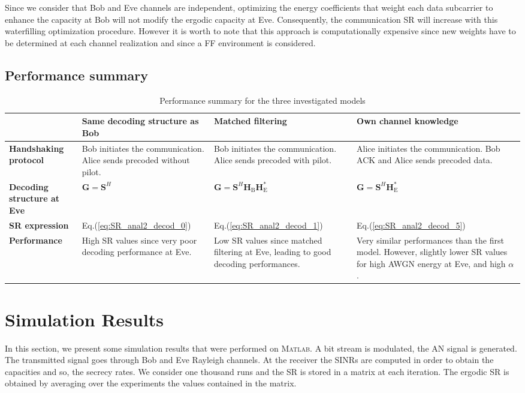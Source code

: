\documentclass[journal,comsoc]{IEEEtran}
\let\MYoriglatexcaption\caption
\renewcommand{\caption}[2][\relax]{\MYoriglatexcaption[#2]{#2}}
\newcommand{\HE}{\textbf{H}_{\text{E}}}
\newcommand{\HB}{\textbf{H}_{\text{B}}}
\newcommand{\spread}{\textbf{S}}
\begin{document}
Since we consider that Bob and Eve channels are independent, optimizing the energy coefficients that weight each data subcarrier to enhance the capacity at Bob will not modify the  ergodic capacity at Eve. Consequently, the communication SR will increase with this waterfilling optimization procedure. However it is worth to note that this approach is computationally expensive since new weights have to be determined at each channel realization and since a FF environment is considered. 

\subsection{Performance summary}
\begin{table}[!thb]
	\centering
	\begin{tabular}{|p{1.8cm}|p{1.8cm}|p{1.8cm}|p{1.8cm}|}
		\hline
		& \textbf{Same decoding structure as Bob} & \textbf{Matched filtering}  & \textbf{Own channel knowledge}  \\ 
		\hline
		\textbf{Handshaking protocol} & Bob initiates the communication. Alice sends precoded without pilot.
		& Bob initiates the communication. Alice sends precoded with pilot. & Alice initiates the communication. Bob ACK and Alice sends precoded data.\\
		\hline
		\textbf{Decoding structure at Eve} &  $\textbf{G} = \spread^H$ & $\textbf{G} = \spread^H \HB \HE^*$ & $\textbf{G} = \spread^H \HE^*$ \\
		\hline
		\textbf{SR expression} & Eq.(\ref{eq:SR_anal2_decod_0})  &  Eq.(\ref{eq:SR_anal2_decod_1}) & Eq.(\ref{eq:SR_anal2_decod_5})\\
		\hline
		\textbf{Performance} &  High SR values since very poor decoding performance at Eve. & Low SR values since matched filtering at Eve, leading to good decoding performances. & Very similar performances than the first model. However, slightly lower SR values for high AWGN energy at Eve, and high $\alpha$. \\
		\hline
	\end{tabular}
	\caption{Performance summary for the three investigated models}
	\label{tab-perf-summary}
\end{table} 


\section{Simulation Results} \label{sec:simulation-results}
In this section, we present some simulation results that were performed on \textsc{Matlab}. A bit stream is modulated, the AN signal is generated. The transmitted signal goes through Bob and Eve Rayleigh channels. At the receiver the SINRs are computed in order to obtain the capacities and so, the secrecy rates. We consider one thousand runs and the SR is stored in a matrix at each iteration. The ergodic SR is obtained by averaging over the experiments the values contained in the matrix. 
\end{document}
